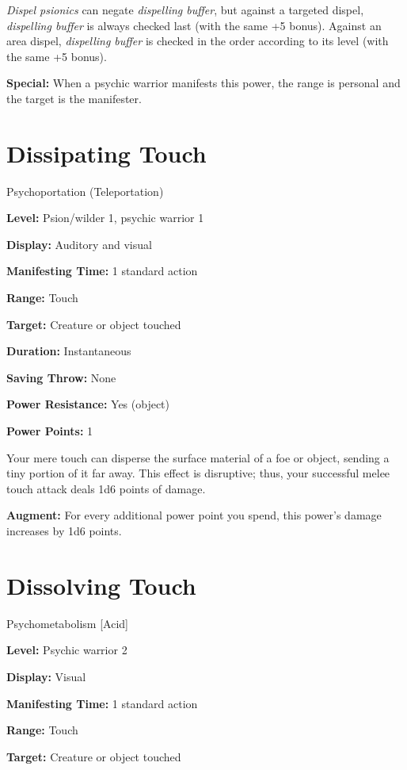 \documentclass{article}
\begin{document}
\textit{Dispel psionics }can negate \textit{dispelling buffer}, but against a targeted 
dispel, \textit{dispelling buffer }is always checked last (with the same +5 bonus). 
Against an area dispel, \textit{dispelling buffer }is checked in the order according 
to its level (with the same +5 bonus).

\textbf{Special:} When a psychic warrior manifests this power, the range is personal 
and the target is the manifester.

\vspace{12pt}
\section*{Dissipating Touch}

Psychoportation (Teleportation)

\textbf{Level:} Psion/wilder 1, psychic warrior 1

\textbf{Display:} Auditory and visual

\textbf{Manifesting Time:} 1 standard action

\textbf{Range:} Touch

\textbf{Target:} Creature or object touched

\textbf{Duration:} Instantaneous

\textbf{Saving Throw:} None

\textbf{Power Resistance:} Yes (object)

\textbf{Power Points:} 1

Your mere touch can disperse the surface material of a foe or object, sending a 
tiny portion of it far away. This effect is disruptive; thus, your successful melee 
touch attack deals 1d6 points of damage.

\textbf{Augment:} For every additional power point you spend, this power's damage 
increases by 1d6 points. 

\vspace{12pt}
\section*{Dissolving Touch}

Psychometabolism [Acid]

\textbf{Level:} Psychic warrior 2

\textbf{Display:} Visual

\textbf{Manifesting Time:} 1 standard action

\textbf{Range:} Touch

\textbf{Target:} Creature or object touched
\end{document}
